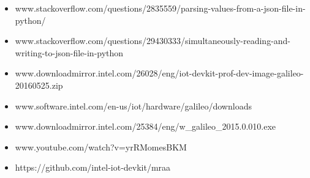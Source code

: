 \documentclass[11pt,a4paper]{article}
\begin{document}
\begin{itemize}
        \item  www.stackoverflow.com/questions/2835559/parsing-values-from-a-json-file-in-python/
        \item  www.stackoverflow.com/questions/29430333/simultaneously-reading-and-writing-to-json-file-in-python
        \item  www.downloadmirror.intel.com/26028/eng/iot-devkit-prof-dev-image-galileo-20160525.zip
        \item  www.software.intel.com/en-us/iot/hardware/galileo/downloads
        \item  www.downloadmirror.intel.com/25384/eng/w\_galileo\_2015.0.010.exe
        \item  www.youtube.com/watch?v=yrRMomesBKM
        \item  https://github.com/intel-iot-devkit/mraa


    \end{itemize}
	
\end{document}
